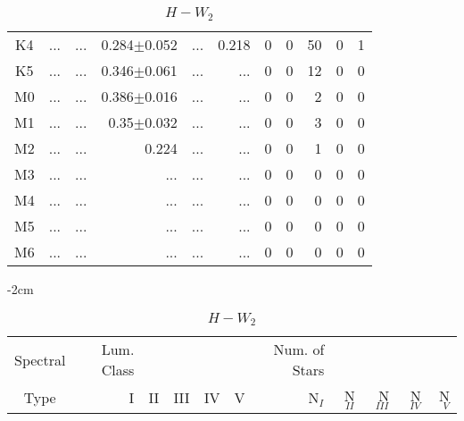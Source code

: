 \begin{table}[t]
\begin{table}[t]
\begin{center}
\begin{tabular}{c|rrrrr|rrrrr}
    K4	&	 ...	&	 ...	&	0.284$\pm$0.052	&	 ...	&	0.218	&	0	&	0	&	50	&	0	&	1	\\
    K5	&	 ...	&	 ...	&	0.346$\pm$0.061	&	 ...	&	 ...	&	0	&	0	&	12	&	0	&	0	\\
    M0	&	 ...	&	 ...	&	0.386$\pm$0.016	&	 ...	&	 ...	&	0	&	0	&	2	&	0	&	0	\\
    M1	&	 ...	&	 ...	&	0.35$\pm$0.032	&	 ...	&	 ...	&	0	&	0	&	3	&	0	&	0	\\
    M2	&	 ...	&	 ...	&	0.224	&	 ...	&	 ...	&	0	&	0	&	1	&	0	&	0	\\
    M3	&	 ...	&	 ...	&	 ...	&	 ...	&	 ...	&	0	&	0	&	0	&	0	&	0	\\
    M4	&	 ...	&	 ...	&	 ...	&	 ...	&	 ...	&	0	&	0	&	0	&	0	&	0	\\
    M5	&	 ...	&	 ...	&	 ...	&	 ...	&	 ...	&	0	&	0	&	0	&	0	&	0	\\
    M6	&	 ...	&	 ...	&	 ...	&	 ...	&	 ...	&	0	&	0	&	0	&	0	&	0	\\
        \bottomrule
        \end{tabular}
    \end{center}
    \end{table}
    
    
    \begin{table}[t]
    \tiny
    \centering
    \caption{$H-W_{2}$}
    \begin{center}
        \addtolength{\leftskip} {-2cm}
        \addtolength{\rightskip}{-2cm}
        \begin{tabular}{c|rrrrr|rrrrr}
        \toprule
        Spectral & Lum. Class & & & & & Num. of Stars & & & &  \\
        Type & I & II & III &  IV & V & N$_{I}$ & N$_{II}$ & N$_{III}$ & N$_{IV}$ & N$_{V}$ \\ \midrule
      

\end{tabular}
\end{center}
\end{table}
\end{table}

